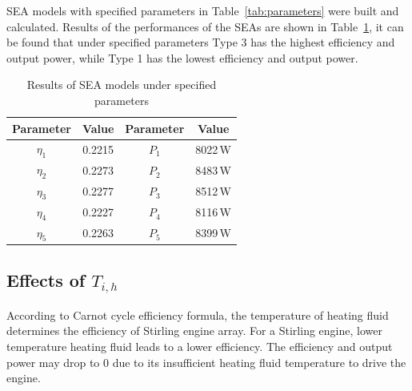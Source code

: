 SEA models with specified parameters in Table~\ref{tab:parameters} were built and calculated. Results of the performances of the SEAs are shown in Table~\ref{tab:result}, it can be found that under specified parameters Type 3 has the highest efficiency and output power, while Type 1 has the lowest efficiency and output power.

\begin{table}[htbp]
	\caption{Results of SEA models under specified parameters}
	\begin{center}
	\begin{tabular}{cccc}
		\toprule
		Parameter		&	Value	&	Parameter		&	Value\\
		\midrule
		$\eta_1$	&	0.2215	&	$P_1$		&	8022\,W\\
		$\eta_2$	&	0.2273	&	$P_2$		&	8483\,W\\
		$\eta_3$	&	0.2277	&	$P_3$		&	8512\,W\\
		$\eta_4$	&	0.2227	&	$P_4$		&	8116\,W\\
		$\eta_5$	&	0.2263	&	$P_5$		&	8399\,W\\		
		\bottomrule
	\end{tabular}
	\end{center}
	\label{tab:result}
\end{table}

\subsection{Effects of $T_{i,h}$}
According to Carnot cycle efficiency formula, the temperature of heating fluid determines the efficiency of Stirling engine array. For a Stirling engine, lower temperature heating fluid leads to a lower efficiency. The efficiency and output power may drop to 0 due to its insufficient heating fluid temperature to drive the engine.

